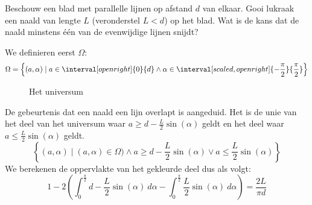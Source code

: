 \documentclass[main.tex]{subfiles}
\begin{document}
\begin{oef}
  Beschouw een blad met parallelle lijnen op afstand $d$ van elkaar.
  Gooi lukraak een naald van lengte $L$ (veronderstel $L < d$) op het blad.
  Wat is de kans dat de naald minstens \'e\'en van de evenwijdige lijnen snijdt?
  \begin{figure}[H]
    \centering
  \end{figure}
  We definieren eerst $\Omega$:
  \[ \Omega = \left\{ (a,\alpha) \mid a \in \interval[open right]{0}{d} \wedge \alpha \in \interval[scaled, open right]{-\frac{\pi}{2}}{ \frac{\pi}{2}} \right\} \]
  \begin{figure}[H]
    \centering
    \caption{Het universum}
  \end{figure}
  De gebeurtenis dat een naald een lijn overlapt is aangeduid.
  Het is de unie van het deel van het universum waar $a \ge d-\frac{L}{2}\sin(\alpha)$ geldt en het deel waar $a \le \frac{L}{2}\sin(\alpha)$ geldt.
  \[ \left\{ (a,\alpha) \mid (a, \alpha) \in \Omega) \wedge a \ge d-\frac{L}{2}\sin(\alpha) \vee a \le \frac{L}{2}\sin(\alpha) \right\}\]
  We berekenen de oppervlakte van het gekleurde deel dus als volgt:
  \[ 1-2\left(\int_{0}^{\frac{\pi}{2}} d-\frac{L}{2}\sin(\alpha)\ d\alpha- \int_{0}^{\frac{\pi}{2}}\frac{L}{2}\sin(\alpha)\ d\alpha \right) = \frac{2L}{\pi d} \]
\end{oef}
\end{document}
